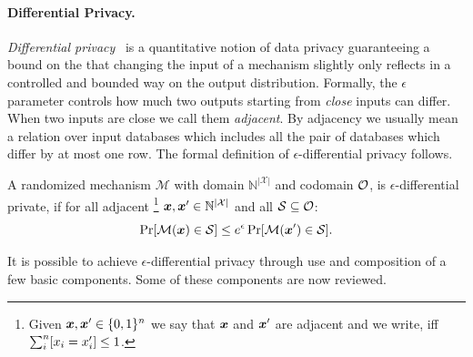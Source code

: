 \documentclass{article}
\begin{document}
\paragraph{Differential Privacy.}
%
%
\emph{Differential privacy}~\cite{dwork2006} is a quantitative notion
of data privacy guaranteeing  a bound on the that changing the input of a mechanism slightly only reflects
in a controlled and bounded way on the output distribution. 
Formally, the $\epsilon$ parameter
controls how much two outputs starting from \emph{close} inputs can differ. When two inputs are close we call them \emph{adjacent}.
By adjacency we usually mean a relation over input databases which includes all the pair of databases which differ by at most one row.
The formal definition of $\epsilon$-differential privacy follows.
\begin{defn}
\label{def_epsilon_dp}
A randomized mechanism $\mathcal{M}$ with domain $\mathbb{N}^{|\mathcal{X}|}$ and codomain $\mathcal{O}$, is $\epsilon$-differential private, if for all adjacent
\footnote{Given $\boldsymbol{x}, \boldsymbol{x}'\in\{0,1\}^n$  we say that $\boldsymbol{x}$ and $\boldsymbol{x}'$ are adjacent and we write, iff
$\sum_{i}^{n}[x_i = x'_i ]\leq 1$. } $\boldsymbol{x}, \boldsymbol{x}' \in \mathbb{N}^{|\mathcal{X}|}$ and all $\mathcal{S} \subseteq \mathcal{O}$:
\begin{equation*}
\Pr[\mathcal{M}(\boldsymbol{x}) \in \mathcal{S}] \leq e^\epsilon \Pr[\mathcal{M}(\boldsymbol{x}') \in \mathcal{S}].
\end{equation*}

\end{defn}


It is possible to achieve $\epsilon$-differential privacy through use and composition of
a few basic components. Some of these components are now reviewed.
%
%
\end{document}
